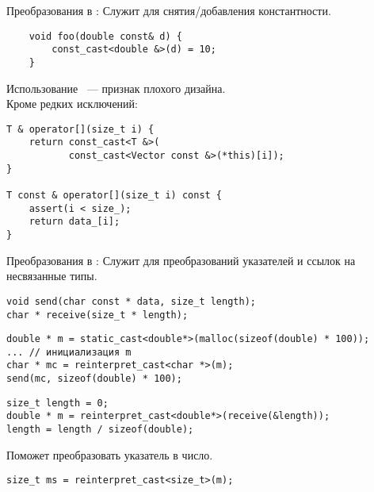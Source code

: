 \documentclass{beamer}
\begin{document}
\begin{frame}[fragile]{Преобразования в \langcpp: }
    Служит для снятия/добавления константности.\pause
\begin{lstlisting}
    void foo(double const& d) {
        const_cast<double &>(d) = 10;
    } 
\end{lstlisting}
Использование ~--- признак плохого дизайна.\\
\medskip\pause
Кроме редких исключений:
\begin{lstlisting}
T & operator[](size_t i) {
    return const_cast<T &>(
           const_cast<Vector const &>(*this)[i]);
}

T const & operator[](size_t i) const {
    assert(i < size_);
    return data_[i];
}
\end{lstlisting}
\end{frame}

\begin{frame}[fragile]{Преобразования в \langcpp: }{}
    Служит для преобразований указателей и ссылок на несвязанные типы.\pause
    
\begin{lstlisting}
void send(char const * data, size_t length);
char * receive(size_t * length);
\end{lstlisting}\pause
\begin{lstlisting}
double * m = static_cast<double*>(malloc(sizeof(double) * 100)); 
... // инициализация m
char * mc = reinterpret_cast<char *>(m);
send(mc, sizeof(double) * 100);
\end{lstlisting}\pause
\begin{lstlisting}
size_t length = 0;
double * m = reinterpret_cast<double*>(receive(&length));
length = length / sizeof(double);
\end{lstlisting}\pause

Поможет преобразовать указатель в число.
\begin{lstlisting}
size_t ms = reinterpret_cast<size_t>(m);
\end{lstlisting}
\end{frame}
\end{document}
